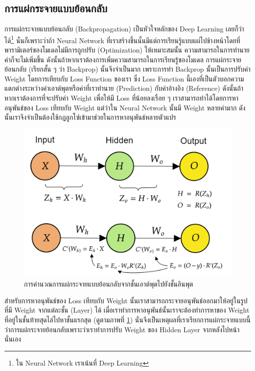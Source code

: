 \subsection{การแผ่กระจายแบบย้อนกลับ}
\label{ssec:backprop}

การแผ่กระจายแบบย้อนกลับ (Backpropagation) เป็นหัวใจหลักของ Deep Learning เลยก็ว่าได้\footnote{ใน Neural Network เราเน้นที่ Deep Learning} นั่นก็เพราะว่าถ้า Neural Network ที่เราสร้างขึ้นนั้นมีแต่การเรียนรู้แบบแผ่ไปข้างหน้าโดยที่พารามิเตอร์ของโมเดลไม่มีการถูกปรับ (Optimization) ให้เหมาะสมนั้น ความสามารถในการทำนายค่าก็จะไม่เพิ่มขึ้น ดังนั้นถ้าหากเราต้องการเพิ่มความสามารถในการเรียนรู้ของโมเดล การแผ่กระจายย้อนกลับ (เรียกสั้น ๆ ว่า Backprop) นั้นจึงจำเป็นมาก เพราะการทำ Backprop นั้นเป็นการปรับค่า Weight โดยการเทียบกับ Loss Function ของเรา ซึ่ง Loss Function นี้เองที่เป็นตัวบอกความแตกต่างระหว่างค่าเอาต์พุตหรือค่าที่เราทำนาย (Prediction) กับค่าอ้างอิง (Reference) ดังนั้นถ้าหากเราต้องการที่จะปรับค่า Weight เพื่อให้มี Loss ที่น้อยลงเรื่อย ๆ เราสามารถทำได้โดยการหาอนุพันธ์ของ Loss เทียบกับ Weight แต่ว่าใน Neural Network นั้นมี Weight หลายค่ามาก ดังนั้นเราจึงจำเป็นต้องใช้กฎลูกโซ่เข้ามาช่วยในการหาอนุพันธ์หลายตัวแปร

\begin{figure}[H]
    \centering
    \includegraphics[width=0.55\linewidth]{fig/nn_backprop.png}
    \caption{การคำนวณการแผ่กระจายแบบย้อนกลับจากชั้นเอาต์พุตไปยังชั้นอินพุต}
    \label{fig:nn_bp}
\end{figure}

สำหรับการหาอนุพันธ์ของ Loss เทียบกับ Weight นั้นเราสามารถกระจายอนุพันธ์ออกมาให้อยู่ในรูปที่มี Weight จากแต่ละชั้น (Layer) ได้ เมื่อเราทำการหาอนุพันธ์นั้นเราจะต้องทำการหาของ Weight ที่อยู่ในชั้นท้ายสุดไล่ไปหาชั้นแรกสุด (ดูตามภาพที่ \ref{fig:nn_bp}) นั่นจึงเป็นเหตุผลที่เราเรียกการแผ่กระจายแบบนี้ว่าการแผ่กระจายย้อนกลับเพราะว่าเราทำการปรับ Weight ของ Hidden Layer จากหลังไปหน้านั่นเอง

